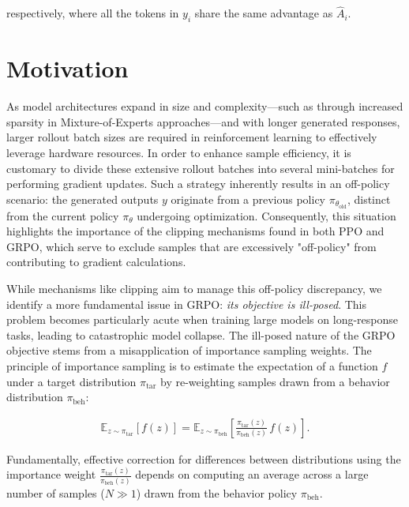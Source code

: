 respectively, where all the tokens in $y_i$ share the same advantage as $\widehat{A}_{i}$.

\section{Motivation}
\label{sec:motivation}

As model architectures expand in size and complexity—such as through increased sparsity in Mixture-of-Experts approaches—and with longer generated responses, larger rollout batch sizes are required in reinforcement learning to effectively leverage hardware resources. In order to enhance sample efficiency, it is customary to divide these extensive rollout batches into several mini-batches for performing gradient updates. Such a strategy inherently results in an off-policy scenario: the generated outputs $y$ originate from a previous policy $\pi_{\theta_\text{old}}$, distinct from the current policy $\pi_\theta$ undergoing optimization. Consequently, this situation highlights the importance of the clipping mechanisms found in both PPO and GRPO, which serve to exclude samples that are excessively "off-policy" from contributing to gradient calculations.

While mechanisms like clipping aim to manage this off-policy discrepancy, we identify a more fundamental issue in GRPO: \textit{its objective is ill-posed}. This problem becomes particularly acute when training large models on long-response tasks, leading to catastrophic model collapse. The ill-posed nature of the GRPO objective stems from a misapplication of importance sampling weights. The principle of importance sampling is to estimate the expectation of a function $f$ under a target distribution $\pi_\text{tar}$ by re-weighting samples drawn from a behavior distribution $\pi_\text{beh}$:

\begin{align}
\mathbb{E}_{z \sim \pi_\text{tar}} \left[ f(z) \right] = \mathbb{E}_{z \sim \pi_\text{beh}} \left[ \frac{ \pi_\text{tar} (z) }{ \pi_\text{beh} (z)} \, f(z) \right].
\end{align}

Fundamentally, effective correction for differences between distributions using the importance weight $\frac{ \pi_\text{tar} (z) }{ \pi_\text{beh} (z)}$ depends on computing an average across a large number of samples ($N \gg 1$) drawn from the behavior policy $\pi_\text{beh}$. 

